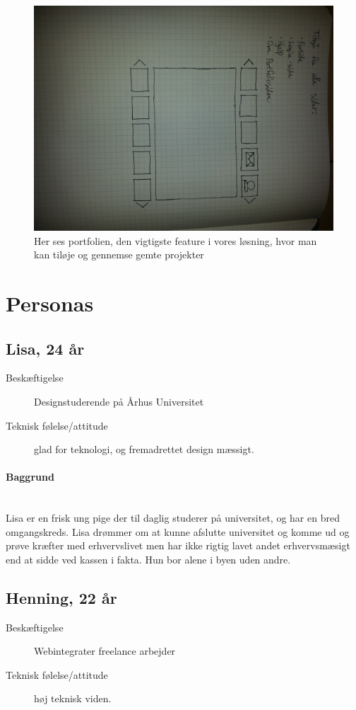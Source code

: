 \documentclass[a4paper,titlepage,fleqn,12pt]{article}
\begin{document}
\begin{figure}[H]
\includegraphics[width=\textwidth]{mainside.jpg}
\caption{Her ses portfolien, den vigtigste feature i vores løsning, hvor man kan tiløje og gennemse gemte projekter}
\end{figure}

\section{Personas}
\subsection{Lisa, 24 år}
\begin{description}
	\item[Beskæftigelse] Designstuderende på Århus Universitet
	\item[Teknisk følelse/attitude] glad for teknologi, og fremadrettet design mæssigt.
\end{description}
\paragraph{Baggrund}\hfill\\Lisa er en frisk ung pige der til daglig studerer på universitet, og har en bred omgangskreds. Lisa drømmer om at kunne afslutte universitet og komme ud og prøve kræfter med erhvervslivet men har ikke rigtig lavet andet erhvervsmæsigt end at sidde ved kassen i fakta. Hun bor alene i byen uden andre.

\subsection{Henning, 22 år}
\begin{description}
	\item[Beskæftigelse] Webintegrater freelance arbejder
	\item[Teknisk følelse/attitude] høj teknisk viden.
\end{description}
\end{document}
